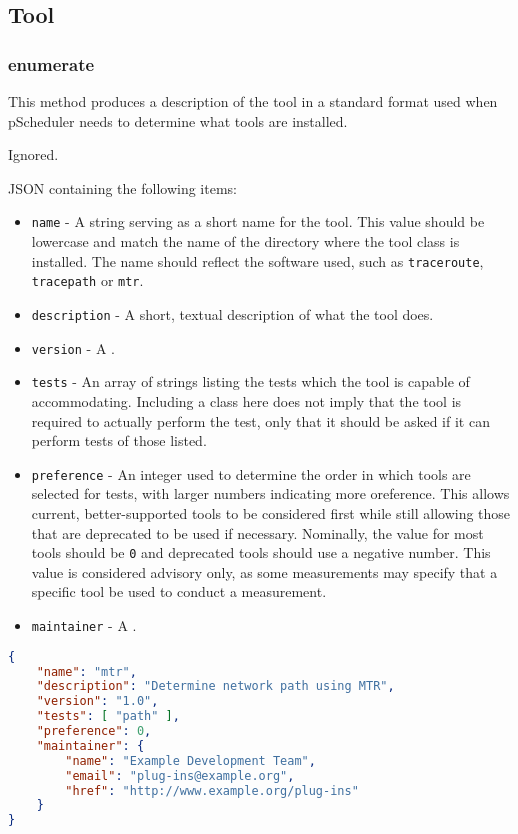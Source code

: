 \documentclass[10pt,titlepage]{article}
\begin{document}



%
%
\subsection{Tool}

\subsubsection{enumerate}

This method produces a description of the tool in a standard format
used when pScheduler needs to determine what tools are installed.

 Ignored.

 JSON containing the following items:
\begin{itemize}
\item{\tt name} - A string serving as a short name for the tool.  This
  value should be lowercase and match the name of the directory where
  the tool class is installed.  The name should reflect the software
  used, such as {\tt traceroute}, {\tt tracepath} or {\tt mtr}.
\item{\tt description} - A short, textual description of what the tool
  does.
\item{\tt version} - A .
\item{\tt tests} - An array of strings listing the tests which the
  tool is capable of accommodating.  Including a class here does not
  imply that the tool is required to actually perform the test, only
  that it should be asked if it can perform tests of those listed.
\item{\tt preference} - An integer used to determine the order in
  which tools are selected for tests, with larger numbers indicating
  more oreference.  This allows current, better-supported tools to be
  considered first while still allowing those that are deprecated to
  be used if necessary.  Nominally, the value for most tools should be
  {\tt 0} and deprecated tools should use a negative number.  This
  value is considered advisory only, as some measurements may specify
  that a specific tool be used to conduct a measurement.
\item{\tt maintainer} - A .
\end{itemize}

\example
\begin{lstlisting}[language=json,firstnumber=1]
{
    "name": "mtr",
    "description": "Determine network path using MTR",
    "version": "1.0",
    "tests": [ "path" ],
    "preference": 0,
    "maintainer": {
        "name": "Example Development Team",
        "email": "plug-ins@example.org",
        "href": "http://www.example.org/plug-ins"
    }
}
\end{lstlisting}
\end{document}
